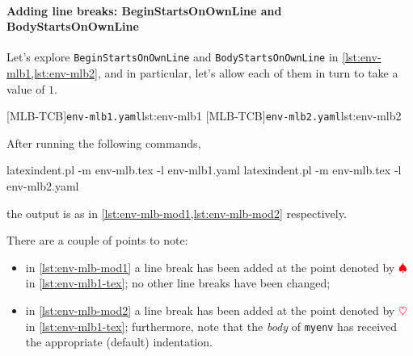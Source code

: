  \paragraph{Adding line breaks: BeginStartsOnOwnLine and BodyStartsOnOwnLine}
  \begin{example}
  Let's explore \texttt{BeginStartsOnOwnLine} and \texttt{BodyStartsOnOwnLine} in
  \cref{lst:env-mlb1,lst:env-mlb2}, and in particular, let's allow each of them in turn
  to take a value of $1$.  

  \begin{cmhtcbraster}
   [MLB-TCB]{\texttt{env-mlb1.yaml}}{lst:env-mlb1}
   [MLB-TCB]{\texttt{env-mlb2.yaml}}{lst:env-mlb2}
  \end{cmhtcbraster}

  After running the following commands, 

  \begin{commandshell}
latexindent.pl -m env-mlb.tex -l env-mlb1.yaml
latexindent.pl -m env-mlb.tex -l env-mlb2.yaml
\end{commandshell}

  the output is as in \cref{lst:env-mlb-mod1,lst:env-mlb-mod2} respectively.

  \begin{widepage}
   \begin{minipage}{.56\linewidth}
   \end{minipage}
   \hfill
   \begin{minipage}{.43\linewidth}
   \end{minipage}
  \end{widepage}

  There are a couple of points to note:
  \begin{itemize}
   \item in \cref{lst:env-mlb-mod1} a line break has been added at the point denoted by
         $\color{red}\spadesuit$ in \cref{lst:env-mlb1-tex}; no other line breaks have
         been changed;
   \item in \cref{lst:env-mlb-mod2} a line break has been added at the point denoted by
         $\color{red}\heartsuit$ in \cref{lst:env-mlb1-tex}; furthermore, note that the
         \emph{body} of \texttt{myenv} has received the appropriate (default)
         indentation.
  \end{itemize}
  \end{example}

